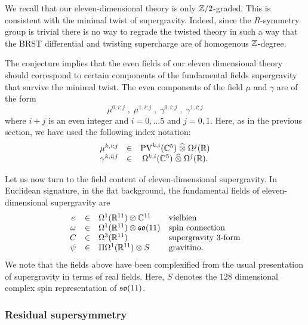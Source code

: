 \documentclass[11pt]{amsart}
\def\pv{{\rm PV}}
\begin{document}
We recall that our eleven-dimensional theory is only $\mathbb Z/2$-graded.
This is consistent with the minimal twist of supergravity.
Indeed, since the $R$-symmetry group is trivial there is no way to regrade the twisted theory in such a way that the BRST differential and twisting supercharge are of homogenous $\mathbb Z$-degree.

The conjecture implies that the even fields of our eleven dimensional theory should correspond to certain components of the fundamental fields supergravity that survive the minimal twist.
The even components of the field $\mu$ and $\gamma$ are of the form
\[
  \mu^{0, i ; j} \; , \; \mu^{1, i ; j} \; , \; \gamma^{0, i ; j} \; , \; \gamma^{1, i ; j}
\]
where $i+j$ is an even integer and $i = 0,\ldots 5$ and $j=0,1$.
Here, as in the previous section, we have used the following index notation:
\[
  \begin{array}{ccccc}
    \mu^{k, i ; j} & \in & \pv^{k,i} (\CC^5) \; \Hat{\otimes} \; \Omega^j(\RR) \\
    \gamma^{k, i ; j} & \in & \Omega^{k,i}(\CC^5) \; \Hat{\otimes} \; \Omega^j(\RR).
  \end{array}
\]

Let us now turn to the field content of eleven-dimensional supergravity.
In Euclidean signature, in the flat background, the fundamental fields of eleven-dimensional supergravity are
\[
  \begin{array}{ccll}
    e & \in & \Omega^1(\mathbb R^{11}) \otimes \mathbb C^{11} & \mbox{vielbien} \\
    \omega & \in & \Omega^1(\mathbb R^{11}) \otimes \mathfrak s \mathfrak o(11) & \mbox{spin connection} \\
    C & \in & \Omega^3(\mathbb R^{11}) & \mbox{supergravity $3$-form} \\
    \psi & \in & \Pi \Omega^1(\mathbb R^{11}) \otimes S & \mbox{gravitino} .
  \end{array}
\]
We note that the fields above have been complexified from the usual presentation of supergravity in terms of real fields.
Here, $S$ denotes the $128$ dimensional complex spin representation of $\mathfrak s \mathfrak o(11)$.

\subsubsection{Residual supersymmetry}

\def\m2{\mathfrak{m}2\mathfrak{brane}}
\def\susy{\mathfrak{susy}}
\def\so{\mathfrak{so}}
\def\siso{\mathfrak{siso}}
\def\fsl{\mathfrak{sl}}
\end{document}
